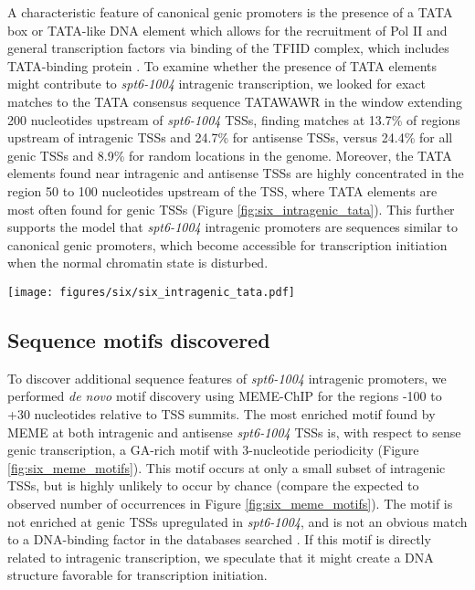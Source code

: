 A characteristic feature of canonical genic promoters is the presence of a TATA box or TATA-like DNA element which allows for the recruitment of Pol II and general transcription factors via binding of the TFIID complex, which includes TATA-binding protein \citep{rhee2012}.
To examine whether the presence of TATA elements might contribute to \textit{spt6-1004} intragenic transcription, we looked for exact matches to the TATA consensus sequence TATAWAWR in the window extending 200 nucleotides upstream of \textit{spt6-1004} TSSs, finding matches at 13.7\% of regions upstream of intragenic TSSs and 24.7\% for antisense TSSs, versus 24.4\% for all genic TSSs and 8.9\% for random locations in the genome.
Moreover, the TATA elements found near intragenic and antisense TSSs are highly concentrated in the region 50 to 100 nucleotides upstream of the TSS, where TATA elements are most often found for genic TSSs (Figure \ref{fig:six_intragenic_tata}).
This further supports the model that \textit{spt6-1004} intragenic promoters are sequences similar to canonical genic promoters, which become accessible for transcription initiation when the normal chromatin state is disturbed.

\begin{SCfigure}[50][h]
    \centering
    \texttt{[image: figures/six/six\_intragenic\_tata.pdf]}
    \caption[Kernel density estimate of matches to a consensus TATA-box motif upstream of genic and \textit{spt6-1004}-induced intragenic TSSs.]{Scaled density of exact matches to the motif TATAWAWR upstream of TSSs. For each category, a Gaussian kernel density estimate of the positions of motif occurrences is scaled by the number of motif occurrences per region.}
    \label{fig:six_intragenic_tata}
\end{SCfigure}

\subsection{Sequence motifs discovered}

To discover additional sequence features of \textit{spt6-1004} intragenic promoters, we performed \textit{de novo} motif discovery using MEME-ChIP \citep{machanick2011} for the regions -100 to +30 nucleotides relative to TSS summits.
The most enriched motif found by MEME at both intragenic and antisense \textit{spt6-1004} TSSs is, with respect to sense genic transcription, a GA-rich motif with 3-nucleotide periodicity (Figure \ref{fig:six_meme_motifs}).
This motif occurs at only a small subset of intragenic TSSs, but is highly unlikely to occur by chance (compare the expected to observed number of occurrences in Figure \ref{fig:six_meme_motifs}).
The motif is not enriched at genic TSSs upregulated in \textit{spt6-1004}, and is not an obvious match to a DNA-binding factor in the databases searched \citep{deboer2011,macisaac2006,newburger2008,pachkov2013,teixeira2017,zhu1999,weirauch2014}.
If this motif is directly related to intragenic transcription, we speculate that it might create a DNA structure favorable for transcription initiation.

